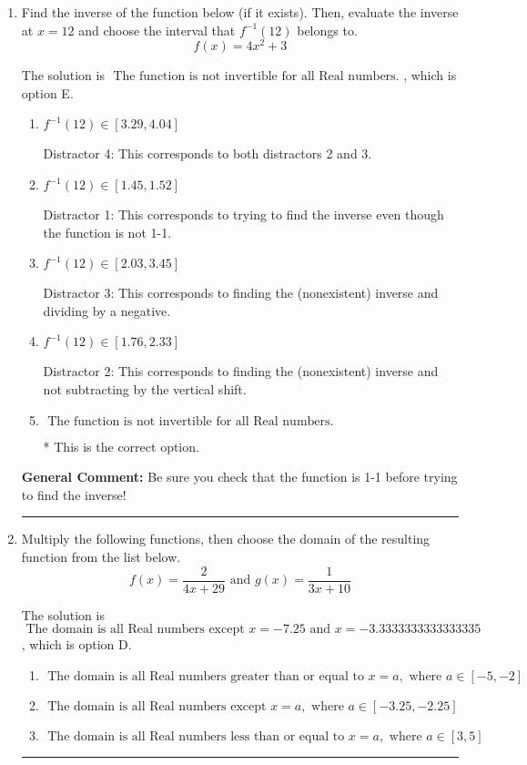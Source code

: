 \documentclass{extbook}[14pt]
\newcommand{\litem}[1]{\item #1

\rule{\textwidth}{0.4pt}}
\begin{document}
\begin{enumerate}\litem{
Find the inverse of the function below (if it exists). Then, evaluate the inverse at $x = 12$ and choose the interval that $f^{-1}(12)$ belongs to.
\[ f(x) = 4 x^2 + 3 \]

The solution is \( \text{ The function is not invertible for all Real numbers. } \), which is option E.\begin{enumerate}[label=\Alph*.]
\item \( f^{-1}(12) \in [3.29, 4.04] \)

 Distractor 4: This corresponds to both distractors 2 and 3.
\item \( f^{-1}(12) \in [1.45, 1.52] \)

 Distractor 1: This corresponds to trying to find the inverse even though the function is not 1-1. 
\item \( f^{-1}(12) \in [2.03, 3.45] \)

 Distractor 3: This corresponds to finding the (nonexistent) inverse and dividing by a negative.
\item \( f^{-1}(12) \in [1.76, 2.33] \)

 Distractor 2: This corresponds to finding the (nonexistent) inverse and not subtracting by the vertical shift.
\item \( \text{ The function is not invertible for all Real numbers. } \)

* This is the correct option.
\end{enumerate}

\textbf{General Comment:} Be sure you check that the function is 1-1 before trying to find the inverse!
}
\litem{
Multiply the following functions, then choose the domain of the resulting function from the list below.
\[ f(x) = \frac{2}{4x+29} \text{ and } g(x) = \frac{1}{3x+10} \]

The solution is \( \text{ The domain is all Real numbers except } x = -7.25 \text{ and } x = -3.3333333333333335 \), which is option D.\begin{enumerate}[label=\Alph*.]
\item \( \text{ The domain is all Real numbers greater than or equal to } x = a, \text{ where } a \in [-5, -2] \)


\item \( \text{ The domain is all Real numbers except } x = a, \text{ where } a \in [-3.25, -2.25] \)


\item \( \text{ The domain is all Real numbers less than or equal to } x = a, \text{ where } a \in [3, 5] \)



\end{enumerate}}
\end{enumerate}
\end{document}
